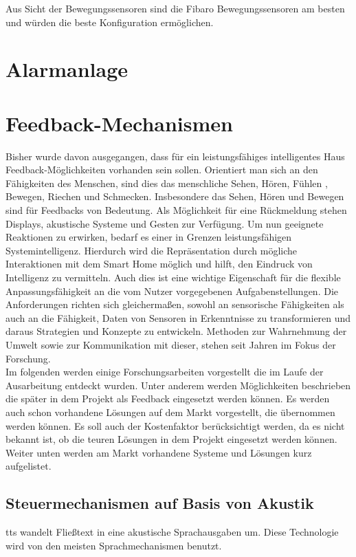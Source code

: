 Aus Sicht der Bewegungssensoren sind die Fibaro Bewegungssensoren am besten und würden die beste Konfiguration ermöglichen.


\section{Alarmanlage}

\newpage
\section{Feedback-Mechanismen}
Bisher wurde davon ausgegangen, dass für ein leistungsfähiges intelligentes Haus Feedback-Möglichkeiten vorhanden sein sollen. Orientiert man sich an den Fähigkeiten des Menschen, sind dies das menschliche Sehen, Hören, Fühlen , Bewegen, Riechen und Schmecken. Insbesondere das Sehen, Hören und Bewegen sind für Feedbacks von Bedeutung. Als Möglichkeit für eine Rückmeldung stehen Displays, akustische Systeme und Gesten zur Verfügung. Um nun geeignete Reaktionen zu erwirken, bedarf es einer in Grenzen leistungsfähigen Systemintelligenz. Hierdurch wird die Repräsentation durch mögliche Interaktionen mit dem Smart Home möglich und hilft, den Eindruck von \glqq Intelligenz\grqq{} zu vermitteln. Auch dies ist eine wichtige Eigenschaft für die flexible Anpassungsfähigkeit an die vom Nutzer vorgegebenen Aufgabenstellungen. Die Anforderungen richten sich gleichermaßen, sowohl an sensorische Fähigkeiten als auch an die Fähigkeit, Daten von Sensoren in Erkenntnisse zu transformieren und daraus Strategien und Konzepte zu entwickeln. Methoden zur Wahrnehmung der Umwelt sowie zur Kommunikation mit dieser, stehen seit Jahren im Fokus der Forschung.\\
Im folgenden werden einige Forschungsarbeiten vorgestellt die im Laufe der Ausarbeitung entdeckt wurden. Unter anderem werden Möglichkeiten beschrieben die später in dem Projekt als Feedback eingesetzt werden können. Es werden auch schon vorhandene Lösungen auf dem Markt vorgestellt, die übernommen werden können. Es soll auch der Kostenfaktor berücksichtigt werden, da es nicht bekannt ist, ob die teuren Lösungen in dem Projekt eingesetzt werden können.\\
Weiter unten werden am Markt vorhandene Systeme und Lösungen kurz aufgelistet.\\

\subsection{Steuermechanismen auf Basis von Akustik}
\acrfull{tts} wandelt Fließtext in eine akustische Sprachausgaben um. Diese Technologie wird von den meisten Sprachmechanismen benutzt.

